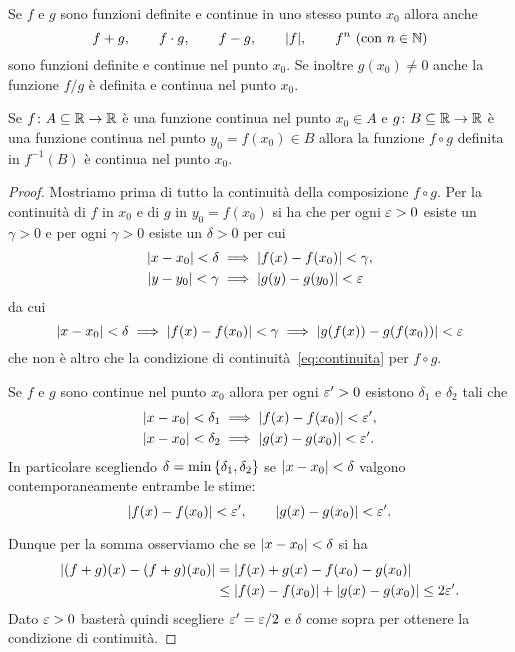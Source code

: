 \begin{theorem}
\label{th:continuita_composizione}%
Se $f$ e $g$ sono funzioni definite e continue
in uno stesso punto $x_0$
allora anche
\[
  f+g, \qquad
  f\cdot g, \qquad
  f-g, \qquad
  {\left|f\right|}, \qquad
  f^n\ \text{(con $n\in \mathbb N$)}
\]
sono funzioni definite e continue nel punto $x_0$.
Se inoltre $g(x_0)\neq 0$ anche la funzione
$f/g$
è definita e continua nel punto $x_0$.

Se $f\colon A\subseteq \mathbb R \to \mathbb R$ è una funzione continua
nel punto $x_0\in A$ e
$g\colon B\subseteq \mathbb R \to \mathbb R$ è una funzione
continua nel punto $y_0=f(x_0)\in B$ allora la funzione $f\circ g$
definita in $f^{-1}(B)$ è continua nel punto $x_0$.
\end{theorem}
%
\begin{proof}
Mostriamo prima di tutto la continuità
della composizione $f\circ g$.
Per la continuità di $f$ in $x_0$ e di $g$ in $y_0=f(x_0)$
si ha che per ogni $\varepsilon>0$ esiste un $\gamma>0$
e per ogni $\gamma>0$ esiste un $\delta>0$ per cui
\begin{align*}
 {\left|x-x_0\right|}< \delta &\implies {\left|f(x)-f(x_0)\right|}<\gamma,\\
 {\left|y-y_0\right|}< \gamma & \implies {\left|g(y)-g(y_0)\right|}<\varepsilon
\end{align*}
da cui
\[
{\left|x-x_0\right|}< \delta
\implies {\left|f(x)-f(x_0)\right|}< \gamma
\implies {\left|g(f(x))-g(f(x_0))\right|} < \varepsilon
\]
che non è altro che la condizione di
continuità~\eqref{eq:continuita} per $f\circ g$.

Se $f$ e $g$ sono continue nel punto $x_0$
allora per ogni $\varepsilon'>0$ esistono $\delta_1$
e $\delta_2$ tali che
\begin{align*}
 {\left|x-x_0\right|} < \delta_1 &\implies {\left|f(x)-f(x_0)\right|} < \varepsilon',
 \\
 {\left|x-x_0\right|} < \delta_2 &\implies {\left|g(x)-g(x_0)\right|} < \varepsilon'.
\end{align*}
In particolare scegliendo $\delta = \min{\left\{ \delta_1,\delta_2 \right\}}$
se ${\left|x-x_0\right|} < \delta$ valgono contemporaneamente
entrambe le stime:
\[
 {\left|f(x)-f(x_0)\right|}< \varepsilon', \qquad
 {\left|g(x)-g(x_0)\right|}< \varepsilon'.
\]

Dunque per la somma osserviamo che se ${\left|x-x_0\right|}<\delta$
si ha
\begin{align*}
 {\left|(f+g)(x) - (f+g)(x_0)\right|}
  &= {\left|f(x)+g(x)-f(x_0)-g(x_0)\right|}\\
  &\le {\left|f(x)-f(x_0)\right|} + {\left|g(x)-g(x_0)\right|}
  \le 2 \varepsilon'.
\end{align*}
Dato $\varepsilon>0$ basterà quindi scegliere $\varepsilon' = \varepsilon / 2$
e $\delta$ come sopra per ottenere la condizione di continuità.


\end{proof}
